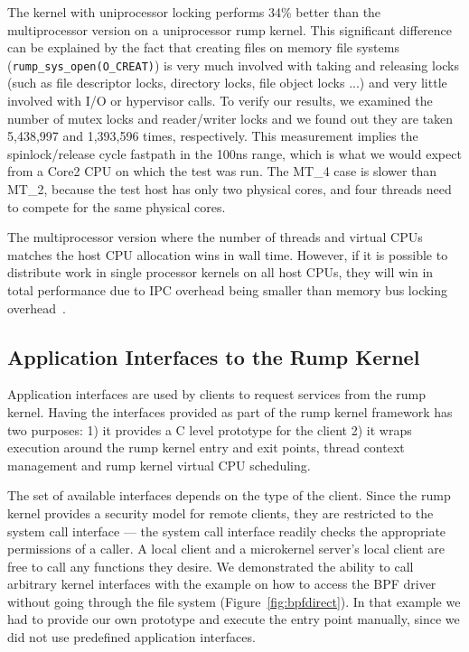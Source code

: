 The kernel with uniprocessor locking performs 34\% better than the
multiprocessor version on a uniprocessor rump kernel.  This significant
difference can be explained by the fact that creating files on
memory file systems (\verb+rump_sys_open(O_CREAT)+) is very
much involved with taking and releasing locks (such as file descriptor
locks, directory locks, file object locks ...) and very little
involved with I/O or hypervisor calls.  To verify our results, we
examined the number of mutex locks and reader/writer locks and we
found out they are taken 5,438,997 and 1,393,596 times, respectively.
This measurement implies the spinlock/release cycle fastpath in the 100ns range,
which is what we would expect from a Core2 CPU on which the test was
run.  The MT\_4 case is slower than MT\_2, because the test host has
only two physical cores, and four threads need to compete for the same
physical cores.

The multiprocessor version where the number of threads and virtual
CPUs matches the host CPU allocation wins in wall time.  However,
if it is possible to distribute work in single processor kernels
on all host CPUs, they will win in total performance due to
IPC overhead being smaller than memory bus locking
overhead~\cite{baumann:multikernel}.

\subsection{Application Interfaces to the Rump Kernel}

Application interfaces are used by clients to request services from
the rump kernel.  Having the interfaces provided as part of the
rump kernel framework has two purposes: 1) it provides a C level
prototype for the client 2) it wraps execution around the rump kernel
entry and exit points, \ie thread context management and rump kernel
virtual CPU scheduling.

The set of available interfaces depends on the type of the client.
Since the rump kernel provides a security model for remote clients,
they are restricted to the system call interface --- the system
call interface readily checks the appropriate permissions of a
caller.  A local client and a microkernel server's local client 
are free to call any functions they desire.  We demonstrated the
ability to call arbitrary kernel interfaces
with the example on how to access the BPF driver without going
through the file system (Figure~\ref{fig:bpfdirect}).  In that
example we had to provide our own prototype and execute the entry
point manually, since we did not use predefined application
interfaces.

